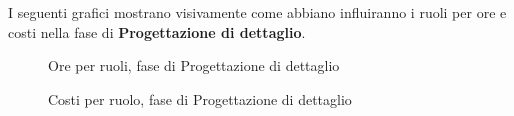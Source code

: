 I seguenti grafici mostrano visivamente come abbiano influiranno i ruoli per ore e costi nella fase di \textbf{Progettazione di dettaglio}.
\begin{figure}[H]
	\centering
	\caption{Ore per ruoli, fase di Progettazione di dettaglio}
\end{figure}
\begin{figure}[H]
	\centering
	\caption{Costi per ruolo, fase di Progettazione di dettaglio}
\end{figure}

